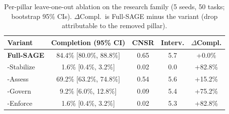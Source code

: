 \begin{table}[t]
\centering
\caption{Per-pillar leave-one-out ablation on the research family (5 seeds, 50 tasks; bootstrap 95\% CIs). $\Delta$Compl.\ is Full-SAGE minus the variant (drop attributable to the removed pillar).}
\label{tab:pillar_ablation}
\begin{tabular}{lcccc}
\toprule
Variant & Completion (95\% CI) & CNSR & Interv. & $\Delta$Compl. \\
\midrule
\textbf{Full-SAGE} & 84.4\% [80.0\%, 88.8\%] & 0.65 & 5.7 & +0.0\% \\
-Stabilize & 1.6\% [0.4\%, 3.2\%] & 0.02 & 0.0 & +82.8\% \\
-Assess & 69.2\% [63.2\%, 74.8\%] & 0.54 & 5.6 & +15.2\% \\
-Govern & 9.2\% [6.0\%, 12.8\%] & 0.09 & 5.4 & +75.2\% \\
-Enforce & 1.6\% [0.4\%, 3.2\%] & 0.02 & 5.3 & +82.8\% \\
\bottomrule
\end{tabular}
\end{table}
